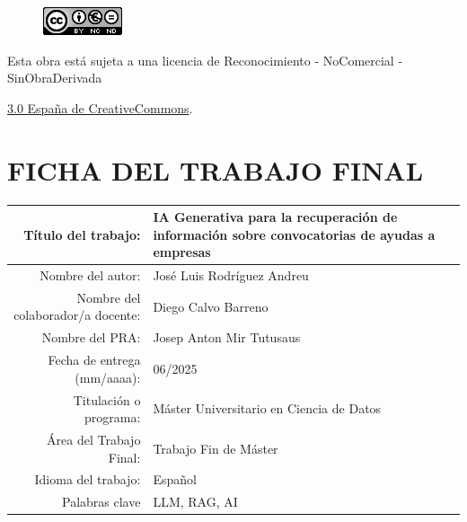 \setcounter{page}{1} 
\pagestyle{plain}




\vspace{1cm}

\begin{figure}[ht]
    \centering
	\includegraphics[scale=1]{images/license.png}
\end{figure}

Esta obra está sujeta a una licencia de Reconocimiento -  NoComercial - SinObraDerivada

\href{https://creativecommons.org/licenses/by-nc-nd/3.0/es/}{3.0 España de CreativeCommons}.

\chapter*{FICHA DEL TRABAJO FINAL}

\begin{table}[ht]
	\centering{}
	\renewcommand{\arraystretch}{2}
	\begin{tabular}{r | l}
		\hline
		Título del trabajo: & IA Generativa para la recuperación 
		de información sobre convocatorias de ayudas a empresas\\
		\hline
        Nombre del autor: & José Luis Rodríguez Andreu\\
		\hline
        Nombre del colaborador/a docente: & Diego Calvo Barreno\\
		\hline
        Nombre del PRA: & Josep Anton Mir Tutusaus\\
		\hline
        Fecha de entrega (mm/aaaa): & 06/2025\\
		\hline
        Titulación o programa: & Máster Universitario en Ciencia de Datos\\
		\hline
        Área del Trabajo Final: & Trabajo Fin de Máster\\
		\hline
        Idioma del trabajo: & Español\\
		\hline
        Palabras clave & LLM, RAG, AI\\
		\hline
	\end{tabular}
\end{table}

